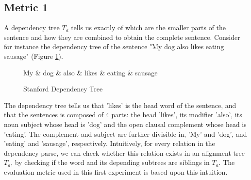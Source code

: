 \documentclass{report}
\theoremstyle{definition}
\theoremstyle{plain}
\begin{document}




\subsection{Metric 1}

A dependency tree $T_d$ tells us exactly of which are the smaller parts of the sentence and how they are combined to obtain the complete sentence. Consider for instance the dependency tree of the sentence "My dog also likes eating sausage" (Figure \ref{fig:deptree1}).

\begin{figure}[!h]\label{fig:deptree1}
\centering
\begin{dependency}[theme=simple]%
\begin{deptext}[column sep=.5cm, row sep=.1ex]
My \& dog \& also \& likes \& eating \& sausage \\
\end{deptext}
\end{dependency}
\caption{Stanford Dependency Tree}
\end{figure}

\noindent The dependency tree tells us that 'likes' is the head word of the sentence, and that the sentences is composed of 4 parts: the head 'likes', its modifier 'also', its noun subject whose head is 'dog' and the open clausal complement whose head is 'eating'. The complement and subject are further divisible in, 'My' and 'dog', and 'eating' and 'sausage', respectively. Intuitively, for every relation in the dependency parse, we can check whether this relation exists in an alignment tree $T_a$, by checking if the word and its depending subtrees are siblings in $T_a$. The evaluation metric used in this first experiment is based upon this intuition.
\end{document}
